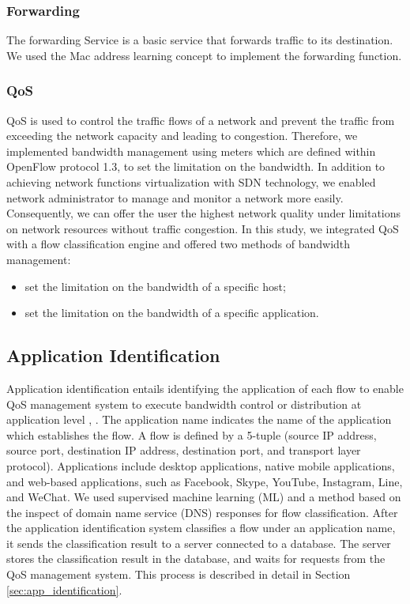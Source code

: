 \documentclass[journal]{IEEEtran}
\begin{document}
\subsubsection{Forwarding}
The forwarding Service is a basic service that forwards traffic to its destination. We used the Mac address learning concept to implement the forwarding function.

\subsubsection{QoS}
QoS is used to control the traffic flows of a network and prevent the traffic from exceeding the network capacity and leading to congestion. Therefore, we implemented bandwidth management using meters which are defined within OpenFlow protocol 1.3, to set the limitation on the bandwidth. In addition to achieving network functions virtualization with SDN technology, we enabled network administrator to manage and monitor a network more easily. Consequently, we can offer the user the highest network quality under limitations on network resources without traffic congestion.
In this study, we integrated QoS with a flow classification engine and offered two methods of bandwidth management:

\begin{itemize}[]
\item set the limitation on the bandwidth of a specific host;
\item set the limitation on the bandwidth of a specific application.
\end{itemize}



\subsection{Application Identification}
Application identification entails identifying the application of each flow to enable QoS management system
to execute bandwidth control or distribution at application level \cite{dynamic-qos-umeida}, \cite{network-slicing-asia-pacific}. The application name indicates the name of the application which establishes the flow. A flow is defined by a 5-tuple (source IP address, source port, destination IP address, destination port, and transport layer protocol). Applications include desktop applications, native mobile applications, and web-based applications, such as Facebook, Skype, YouTube, Instagram, Line, and WeChat. We used supervised machine learning (ML) and a method based on the inspect of domain name service (DNS) responses for flow classification. After the application identification system classifies a flow under an application name, it sends the classification result to a server connected to a database. The server stores the classification result in the database, and waits for requests from the QoS management system. This process is described in detail in Section \ref{sec:app_identification}.
\end{document}
